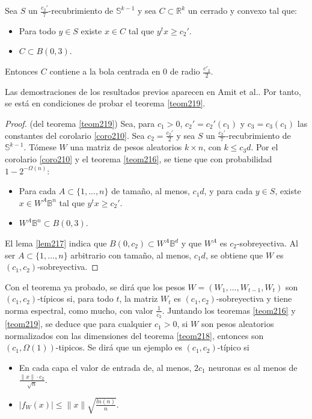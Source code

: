 \begin{lema} \label{lem217}
Sea $S$ un $\frac{c_2'}{7}$-recubrimiento de $\mathbb{S}^{k-1}$ y sea $C \subset \mathbb{R}^k$ un cerrado y convexo tal que:
\begin{itemize}
	\item Para todo $y \in S$ existe $x \in C$ tal que $y^{t} x \geq c_2'$.
	\item $C \subset B(0,3)$.
\end{itemize}

Entonces $C$ contiene a la bola centrada en $0$ de radio $\frac{c'_2}{2}$.

\end{lema}

Las demostraciones de los resultados previos aparecen en Amit et al.\cite{FActivation}. Por tanto, se está en condiciones de probar el teorema \ref{teom219}.

\begin{proof}(del teorema \ref{teom219})
Sea, para $c_1>0$, $c_2' = c_2'(c_1)$ y $c_3=c_3(c_1)$ las constantes del corolario \ref{coro210}. Sea $c_2 = \frac{c_2'}{2}$ y sea $S$ un $\frac{c_2'}{7}$-recubrimiento de $\mathbb{S}^{k-1}$. Tómese $W$ una matriz de pesos aleatorios $k \times n$, con $k \leq c_3 d$. Por el corolario \ref{coro210} y el teorema \ref{teom216}, se tiene que con probabilidad $1-2^{-\Omega(n)}$:

\begin{itemize}
	\item Para cada $A \subset \{1,...,n\}$ de tamaño, al menos, $c_1 d$, y para cada $y \in S$, existe $x \in W^A \mathbb{B}^n$ tal que $y^{t} x \geq c_2'$.
	\item $W^A \mathbb{B}^n \subset B(0,3)$.
\end{itemize}

El lema \ref{lem217} indica que $B(0,c_2) \subset W^A \mathbb{B}^d$ y que $W^A$ es $c_2$-sobreyectiva. Al ser $A \subset \{1,...,n\}$ arbitrario con tamaño, al menos, $c_1 d$, se obtiene que $W$ es $(c_1,c_2)$-sobreyectiva. 

\end{proof}

Con el teorema ya probado, se dirá que los pesos $W=(W_1,...,W_{t-1},W_t)$ son $(c_1,c_2)$-típicos si, para todo $t$, la matriz $W_t$ es $(c_1,c_2)$-sobreyectiva y tiene norma espectral, como mucho, con valor $\frac{1}{c_2}$. Juntando los teoremas \ref{teom216} y \ref{teom219}, se deduce que para cualquier $c_1>0$, si $W$ son pesos aleatorios normalizados con las dimensiones del teorema \ref{teom218}, entonces son $(c_1,\Omega(1))$-tipicos. Se dirá que un ejemplo es $(c_1,c_2)$-típico si
\begin{itemize}
	\item En cada capa el valor de entrada de, al menos, $2 c_1$ neuronas es al menos de $\frac{\|x \| \cdot c_2}{\sqrt{n}}$.
	\item $|f_{W}(x)| \leq \|x \| \sqrt{\frac{ln(n)}{n}}$.
\end{itemize}

